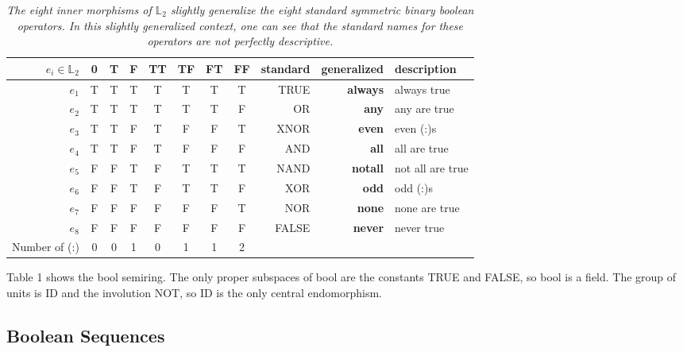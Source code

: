 \documentclass[11pt]{article}
\begin{document}
\begin{table}
\centering 
\begin{tabular}{r c c c c c c c r r l}
\hline\hline
$e_i \in {\mathbb L}_2$ & 0 & T & F & TT & TF & FT & FF & standard & generalized & description \\ [0.5ex] 
\hline
$e_1$  & T & T & T & T & T & T & T & TRUE & {\bf always} & always true \\
$e_2$  & T & T & T & T & T & T & F & OR & {\bf any} & any are true \\
$e_3$  & T & T & F & T & F & F & T & XNOR & {\bf even} & even (:)s \\
$e_4$ & T & T & F & T & F & F & F & AND & {\bf all} & all are true \\
$e_5$ & F & F & T & F & T & T & T & NAND & {\bf notall} & not all are true \\
$e_6$ & F & F & T & F & T & T & F & XOR & {\bf odd} & odd (:)s \\
$e_7$ & F & F & F & F & F & F & T & NOR & {\bf none} & none are true  \\
$e_8$ & F & F & F & F & F & F & F & FALSE & {\bf never} & never true \\
\hline
Number of (:)   & 0 & 0 & 1 & 0 & 1 & 1 & 2 &  \\ 
\hline
\end{tabular}
\caption{{\it The eight inner morphisms of ${\mathbb L}_2$ slightly generalize the eight standard symmetric binary boolean operators.
In this slightly generalized context, one can see that the standard names for these operators are not perfectly descriptive.}}
\label{table:L2}
\end{table} 
Table 1 shows the bool semiring.  The only proper subspaces of bool are the constants TRUE and FALSE, so bool is a field. The group of units is ID and 
the involution NOT, so ID is the only central endomorphism.    

\subsection{Boolean Sequences}
\end{document}
